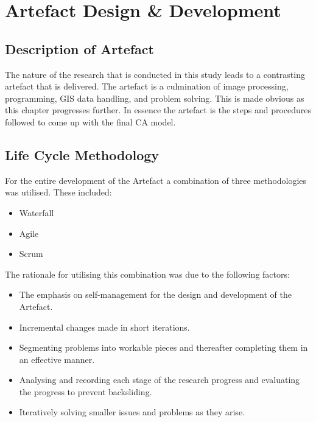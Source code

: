 
\chapter{Artefact Design \& Development} %
\label{Chapter3} %
\section{Description of Artefact}
The nature of the research that is conducted in this study leads to a contrasting artefact that is delivered. The artefact is a culmination of image processing, programming, GIS data handling, and problem solving. This is made obvious as this chapter progresses further. In essence the artefact is the steps and procedures followed to come up with the final CA model.
\section{Life Cycle Methodology}
\label{sec:lcm}
For the entire development of the Artefact a combination of three methodologies was utilised. These included:
\begin{itemize}
\item Waterfall
\item Agile
\item Scrum
\end{itemize}
The rationale for utilising this combination was due to the following factors:
\begin{itemize}
\item The emphasis on self-management for the design and development of the Artefact.
\item Incremental changes made in short iterations.
\item Segmenting problems into workable pieces and thereafter completing them in an effective manner.
\item Analysing and recording each stage of the research progress and evaluating the progress to prevent backsliding.
\item Iteratively solving smaller issues and problems as they arise.
\end{itemize}
